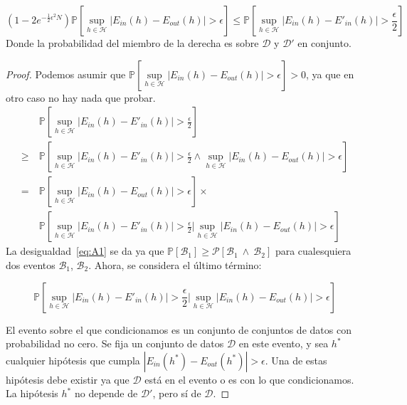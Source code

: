 \begin{lema}
\label{lema:A2}
    \begin{displaymath}
        \left(1-2e^{- \frac{1}{2} \epsilon^2 N} \right)
        \mathbb{P} \left[ \sup_{h \in \mathcal{H}} | E_{in}(h) - E_{out}(h) | > \epsilon \right]
        \leq
        \mathbb{P} \left[ \sup_{h \in \mathcal{H}} | E_{in}(h) - E'_{in}(h) | > \frac{\epsilon}{2} \right]
    \end{displaymath}
Donde la probabilidad del miembro de la derecha es sobre $\mathcal{D}$ y
$\mathcal{D}'$ en conjunto.
\end{lema}

\begin{proof}
    Podemos asumir que $\mathbb{P} \left[ \sup\limits_{h \in \mathcal{H}} | E_{in}(h) - E_{out}(h) | > \epsilon \right] > 0$,
    ya que en otro caso no hay nada que probar.
    \begin{align}
        & \ \mathbb{P} \left[ \sup_{h \in \mathcal{H}} | E_{in}(h) - E'_{in}(h) | > \frac{\epsilon}{2} \right] \nonumber \\
        \geq & \ \mathbb{P} \left[ \sup_{h \in \mathcal{H}} | E_{in}(h) - E'_{in}(h) | > \frac{\epsilon}{2} \wedge
        \sup_{h \in \mathcal{H}} | E_{in}(h) - E_{out}(h) | > \epsilon \right] \label{eq:A1} \\
        =& \ \mathbb{P} \left[ \sup_{h \in \mathcal{H}} | E_{in}(h) - E_{out}(h) | > \epsilon \right] \times \nonumber \\
        & \ \mathbb{P} \left[ \sup_{h \in \mathcal{H}} | E_{in}(h) - E'_{in}(h) | > \frac{\epsilon}{2} \Big\vert
          \sup_{h \in \mathcal{H}} | E_{in}(h) - E_{out}(h) | > \epsilon \right] \nonumber
    \end{align}
    La desigualdad~\ref{eq:A1} se da ya que
    $\mathbb{P}[\mathcal{B}_1] \geq \mathcal{P} \left[ \mathcal{B}_1 \ \wedge
    \ \mathcal{B}_2 \right]$ para cualesquiera dos eventos
    $\mathcal{B}_1$, $\mathcal{B}_2$.
    Ahora, se considera el último término:


    \begin{displaymath}
        \mathbb{P} \left[ \sup_{h \in \mathcal{H}} | E_{in}(h) - E'_{in}(h) | > \frac{\epsilon}{2} \Big\vert
          \sup_{h \in \mathcal{H}} | E_{in}(h) - E_{out}(h) | > \epsilon \right]
    \end{displaymath}

    El evento sobre el que condicionamos es un conjunto de conjuntos de datos
    con probabilidad no cero. Se fija un conjunto de datos $\mathcal{D}$
    en este evento, y sea $h^*$ cualquier hipótesis que cumpla
    $ | E_{in}(h^*) - E_{out}(h^*) | > \epsilon $. Una de estas hipótesis debe
    existir ya que $\mathcal{D}$ está en el evento o es con lo que condicionamos.
    La hipótesis $h^*$ no depende de $\mathcal{D}'$, pero sí de $\mathcal{D}$.


\end{proof}
